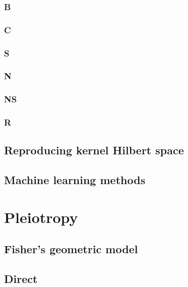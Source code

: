 \documentclass[]{book}
\theoremstyle{definition}
\theoremstyle{definition}
\theoremstyle{definition}
\theoremstyle{remark}
\begin{document}
\subsection{B}\label{b}

\subsection{C}\label{c}

\subsection{S}\label{s}

\subsection{N}\label{n}

\subsection{NS}\label{ns}

\subsection{R}\label{r}

\section{Reproducing kernel Hilbert
space}\label{reproducing-kernel-hilbert-space}

\section{Machine learning methods}\label{machine-learning-methods}

\chapter{Pleiotropy}\label{pleiotropy}

\section{Fisher's geometric model}\label{fishers-geometric-model}

\section{Direct}\label{direct}
\end{document}
